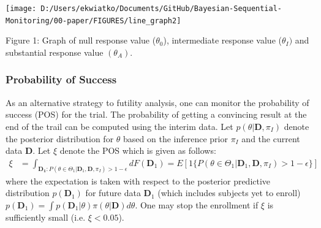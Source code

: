 \documentclass[12pt]{article}
\begin{document}
\begin{center}
\texttt{[image: D:/Users/ekwiatko/Documents/GitHub/Bayesian-Sequential-Monitoring/00-paper/FIGURES/line\_graph2]}

Figure 1: Graph of null response value ($\theta_0$), intermediate response value ($\theta_I)$ and substantial response value $(\theta_A)$.
\end{center}

\subsubsection*{Probability of Success}
As an alternative strategy to futility analysis, one can monitor the probability of success (POS) for the trial. The probability of getting a convincing result at the end of the trail can be computed using the interim data. Let $p(\theta|\mathbf{D}, \pi_{I})$ denote the posterior distribution for $\theta$ based on the inference prior $ \pi_{I}$ and the current data $\mathbf{D}$. Let $\xi$ denote the POS which is given as follows:
\begin{align}
\xi&=\int_{\mathbf{D_1}:P(\theta\in\Theta_1|\mathbf{D}_1,\mathbf{D}, \pi_{I})>1-\epsilon}dF(\mathbf{D}_1)=E[1\{P(\theta\in\Theta_1|\mathbf{D}_1,\mathbf{D}, \pi_{I})>1-\epsilon\}]
\end{align}
where the expectation is taken with respect to the posterior predictive distribution $p(\mathbf{D}_1)$ for future data $\mathbf{D}_1$ (which includes subjects yet to enroll) $p(\mathbf{D}_1)=\int p(\mathbf{D}_1|\theta) \pi(\theta|\mathbf{D})d\theta$.
One may stop the enrollment if $\xi$ is sufficiently small (i.e. $\xi<0.05$).
\end{document}
